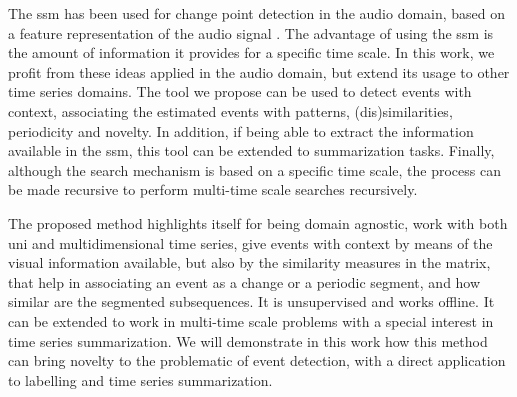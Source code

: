 \par
The \gls{ssm} has been used for change point detection in the audio domain, based on a feature representation of the audio signal \cite{fmp1, fmp2}. The advantage of using the \gls{ssm} is the amount of information it provides for a specific time scale. In this work, we profit from these ideas applied in the audio domain, but extend its usage to other time series domains. The tool we propose can be used to detect events with context, associating the estimated events with patterns, (dis)similarities, periodicity and novelty. In addition, if being able to extract the information available in the \gls{ssm}, this tool can be extended to summarization tasks. Finally, although the search mechanism is based on a specific time scale, the process can be made recursive to perform multi-time scale searches recursively.
\par
The proposed method highlights itself for being domain agnostic, work with both uni and multidimensional time series, give events with context by means of the visual information available, but also by the similarity measures in the matrix, that help in associating an event as a change or a periodic segment, and how similar are the segmented subsequences. It is unsupervised and works offline. It can be extended to work in multi-time scale problems with a special interest in time series summarization. We will demonstrate in this work how this method can bring novelty to the problematic of event detection, with a direct application to labelling and time series summarization.



